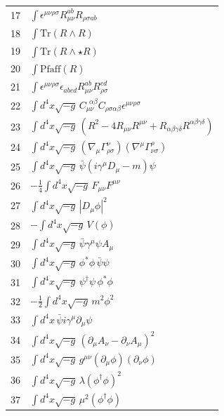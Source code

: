 \documentclass[12pt,a4paper]{article}
\begin{document}
\begin{longtable}{r p{}}
	17 & \(\displaystyle \int \epsilon^{\mu\nu\rho\sigma}R_{\mu\nu}^{ab}R_{\rho\sigma ab}\) \\
	18 & \(\displaystyle \int \mathrm{Tr}(R\wedge R)\) \\
	19 & \(\displaystyle \int \mathrm{Tr}(R\wedge\star R)\) \\
	20 & \(\displaystyle \int \mathrm{Pfaff}(R)\) \\
	21 & \(\displaystyle \int \epsilon^{\mu\nu\rho\sigma}\epsilon_{abcd}R_{\mu\nu}^{ab}R_{\rho\sigma}^{cd}\) \\
	22 & \(\displaystyle \int d^4x\sqrt{-g}\,C_{\mu\nu}^{\ \ \alpha\beta}C_{\rho\sigma\alpha\beta}\epsilon^{\mu\nu\rho\sigma}\) \\
	23 & \(\displaystyle \int d^4x\sqrt{-g}\,(R^2 - 4R_{\mu\nu}R^{\mu\nu} + R_{\alpha\beta\gamma\delta}R^{\alpha\beta\gamma\delta})\) \\
	24 & \(\displaystyle \int d^4x\sqrt{-g}\,(\nabla_\mu\Gamma^{\nu}_{\rho\sigma})(\nabla^\mu\Gamma^{\rho}_{\nu\sigma})\) \\
	25 & \(\displaystyle \int d^4x\sqrt{-g}\,\bar\psi(i\gamma^\mu D_\mu - m)\psi\) \\
	26 & \(\displaystyle -\frac14\int d^4x\sqrt{-g}\,F_{\mu\nu}F^{\mu\nu}\) \\
	27 & \(\displaystyle \int d^4x\sqrt{-g}\,|D_\mu\phi|^2\) \\
	28 & \(\displaystyle -\int d^4x\sqrt{-g}\,V(\phi)\) \\
	29 & \(\displaystyle \int d^4x\sqrt{-g}\,\bar\psi\gamma^\mu\psi A_\mu\) \\
	30 & \(\displaystyle \int d^4x\sqrt{-g}\,\phi^*\phi\,\bar\psi\psi\) \\
	31 & \(\displaystyle \int d^4x\sqrt{-g}\,\psi^\dagger\psi\,\phi^*\phi\) \\
	32 & \(\displaystyle -\frac12\int d^4x\sqrt{-g}\,m^2\phi^2\) \\
	33 & \(\displaystyle \int d^4x\,\bar\psi i\gamma^\mu\partial_\mu\psi\) \\
	34 & \(\displaystyle \int d^4x\sqrt{-g}\,(\partial_\mu A_\nu - \partial_\nu A_\mu)^2\) \\
	35 & \(\displaystyle \int d^4x\sqrt{-g}\,g^{\mu\nu}(\partial_\mu\phi)(\partial_\nu\phi)\) \\
	36 & \(\displaystyle \int d^4x\sqrt{-g}\,\lambda(\phi^\dagger\phi)^2\) \\
	37 & \(\displaystyle \int d^4x\sqrt{-g}\,\mu^2(\phi^\dagger\phi)\) \\

\end{longtable}
\end{document}
